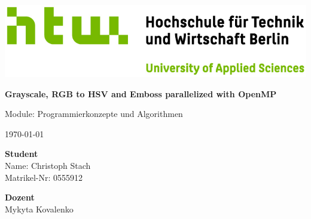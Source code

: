 


    \begin{titlepage}
        \noindent
        \includegraphics[width=1.0\textwidth]{images/Q04_HTW_Berlin_Logo_quer_pos_FARBIG_RGB.jpg}


        \vspace{2cm}

        \begin{center}
            \noindent
            \huge{\textbf{Grayscale, RGB to HSV and Emboss parallelized with OpenMP}}

            \vspace{1cm}

            \noindent
            \LARGE{Module: Programmierkonzepte und Algorithmen}

            \vspace{1cm}

            \noindent
            \small{\today}
        \end{center}

        \vfill

        \noindent
        \begin{minipage}[t]{0.5\textwidth}
            \begin{flushleft}
                \textbf{Student}\\
                Name: Christoph Stach\\
                Matrikel-Nr: 0555912                
            \end{flushleft}
        \end{minipage}
        \begin{minipage}[t]{0.5\textwidth}
            \begin{flushright}
                \textbf{Dozent}\\
                Mykyta Kovalenko\\
            \end{flushright}
        \end{minipage}
    \end{titlepage}

    \tableofcontents

    
    
    
    
    

    \begin{spacing}{1.0}
        \listoffigures        
    \end{spacing} 

    \begin{spacing}{1.75}
        \lstlistoflistings        
    \end{spacing}
